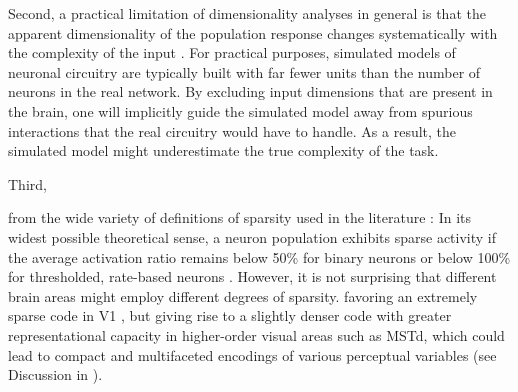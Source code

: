 Second, a practical limitation of dimensionality analyses in general
is that the apparent dimensionality of the population response changes
systematically with the complexity of the input 
\cite{SpanneJorntell2015,Cowley2016,Mazzucato2016}.
For practical purposes, simulated models of neuronal circuitry are typically
built with far fewer units than the number of neurons in the real network.
By excluding input dimensions that are present in the brain,
one will implicitly guide the simulated model away from spurious interactions
that the real circuitry would have to handle.
As a result, the simulated model might underestimate 
the true complexity of the task.

Third, 

 from the wide variety of definitions of sparsity
used in the literature \cite{SpanneJorntell2015,BarthPoulet2012}:
In its widest possible theoretical sense,
a neuron population exhibits sparse activity if the average activation ratio
remains below 50\% for binary neurons 
or below 100\% for thresholded,
rate-based neurons \cite{SpanneJorntell2015}.
However, it is not surprising that different brain areas might employ
different degrees of sparsity.
favoring an extremely sparse code in \ac{V1}
\cite{OlshausenField1996},
but giving rise to a slightly denser code with 
greater representational capacity in higher-order visual areas
such as \ac{MSTd}, 
which could lead to compact and multifaceted encodings
of various perceptual variables
(see Discussion in \cite{Beyeler2016}).

